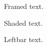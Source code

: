 \documentclass{article}
\begin{document}
\begin{framed}
Framed text.
\end{framed}
\begin{shaded}
Shaded text.
\end{shaded}
\begin{leftbar}
Leftbar text.
\end{leftbar}
\end{document}
